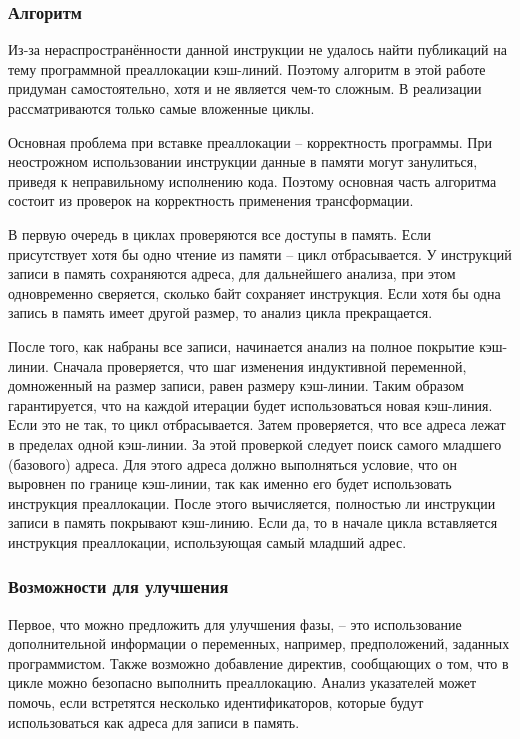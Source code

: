 \documentclass[12pt,a4paper]{article}
\begin{document}
\subsubsection{Алгоритм}

\indent

Из-за нераспространённости данной инструкции не удалось найти публикаций на тему программной преаллокации кэш-линий. Поэтому алгоритм в этой работе придуман самостоятельно, хотя и не является чем-то сложным. В реализации рассматриваются только самые вложенные циклы.

Основная проблема при вставке преаллокации -- корректность программы. При неострожном использовании инструкции данные в памяти могут занулиться, приведя к неправильному исполнению кода. Поэтому основная часть алгоритма состоит из проверок на корректность применения трансформации.



В первую очередь в циклах проверяются все доступы в память. Если присутствует хотя бы одно чтение из памяти -- цикл отбрасывается. У инструкций записи в память сохраняются адреса, для дальнейшего анализа, при этом одновременно сверяется, сколько байт сохраняет инструкция. Если хотя бы одна запись в память имеет другой размер, то анализ цикла прекращается.

После того, как набраны все записи, начинается анализ на полное покрытие кэш-линии. Сначала проверяется, что шаг изменения индуктивной переменной, домноженный на размер записи, равен размеру кэш-линии. Таким образом гарантируется, что на каждой итерации будет использоваться новая кэш-линия. Если это не так, то цикл отбрасывается. Затем проверяется, что все адреса лежат в пределах одной кэш-линии. За этой проверкой следует поиск самого младшего (базового) адреса. Для этого адреса должно выполняться условие, что он выровнен по границе кэш-линии, так как именно его будет использовать инструкция преаллокации. После этого вычисляется, полностью ли инструкции записи в память покрывают кэш-линию. Если да, то в начале цикла вставляется инструкция преаллокации, использующая самый младший адрес.

\subsubsection{Возможности для улучшения}

\indent

Первое, что можно предложить для улучшения фазы, -- это использование дополнительной информации о переменных, например, предположений, заданных программистом. Также возможно добавление директив, сообщающих о том, что в цикле можно безопасно выполнить преаллокацию. Анализ указателей может помочь, если встретятся несколько идентификаторов, которые будут использоваться как адреса для записи в память.
\end{document}
